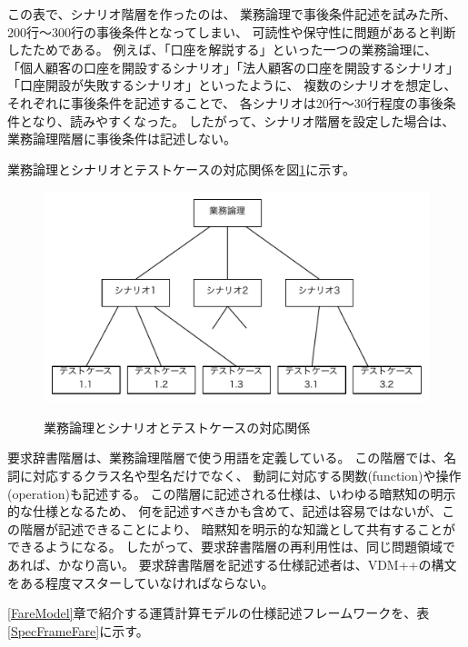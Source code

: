 	この表で、シナリオ階層を作ったのは、
	業務論理で事後条件記述を試みた所、200行〜300行の事後条件となってしまい、
	可読性や保守性に問題があると判断したためである。
	例えば、「口座を解説する」といった一つの業務論理に、
	「個人顧客の口座を開設するシナリオ」「法人顧客の口座を開設するシナリオ」「口座開設が失敗するシナリオ」といったように、
	複数のシナリオを想定し、それぞれに事後条件を記述することで、
	各シナリオは20行〜30行程度の事後条件となり、読みやすくなった。
	したがって、シナリオ階層を設定した場合は、業務論理階層に事後条件は記述しない。

	業務論理とシナリオとテストケースの対応関係を図\ref{fig:SpecTree}に示す。

\begin{figure}[h]
	\centering
	{\includegraphics[width=55zw, keepaspectratio]{./Chapter4/image/SpecTree.pdf}}
	\caption{業務論理とシナリオとテストケースの対応関係}
	\label{fig:SpecTree}
\end{figure}


	要求辞書階層は、業務論理階層で使う用語を定義している。
	この階層では、名詞に対応するクラス名や型名だけでなく、
	動詞に対応する関数(function)や操作(operation)も記述する。
	この階層に記述される仕様は、いわゆる暗黙知の明示的な仕様となるため、
	何を記述すべきかも含めて、記述は容易ではないが、この階層が記述できることにより、
	暗黙知を明示的な知識として共有することができるようになる。
	したがって、要求辞書階層の再利用性は、同じ問題領域であれば、かなり高い。
	要求辞書階層を記述する仕様記述者は、VDM++の構文をある程度マスターしていなければならない。

	\ref{FareModel}章で紹介する運賃計算モデルの仕様記述フレームワークを、表\ref{SpecFrameFare}に示す。

